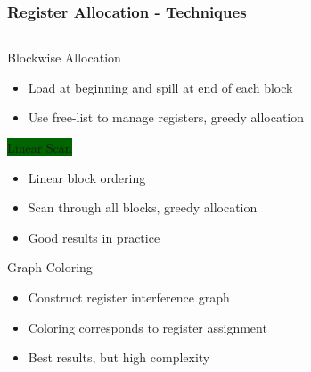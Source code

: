 \documentclass[navbaroff,en]{sdqbeamer}
\begin{document}
\begin{frame}[noframenumbering]
\frametitle{Register Allocation - Techniques}

\setlength{\fboxsep}{2pt}

\begin{columns}
	\begin{column}{0.65\textwidth}
		\begin{contentblock}{Blockwise Allocation}
			\begin{itemize}
				\item Load at beginning and spill at end of each block
				\item Use free-list to manage registers, greedy allocation
			\end{itemize}
		\end{contentblock}
		
		\vspace{-2pt}
		\begin{contentblock}{\colorbox{darkgreen}{Linear Scan}}
			\begin{itemize}
				\item Linear block ordering
				\item Scan through all blocks, greedy allocation
				\item Good results in practice
			\end{itemize}
		\end{contentblock}
		
		\begin{contentblock}{Graph Coloring}
			\begin{itemize}
				\item Construct register interference graph
				\item Coloring corresponds to register assignment
				\item Best results, but high complexity
			\end{itemize}
		\end{contentblock}
	\end{column}
	

\end{columns}
\end{frame}
\end{document}
